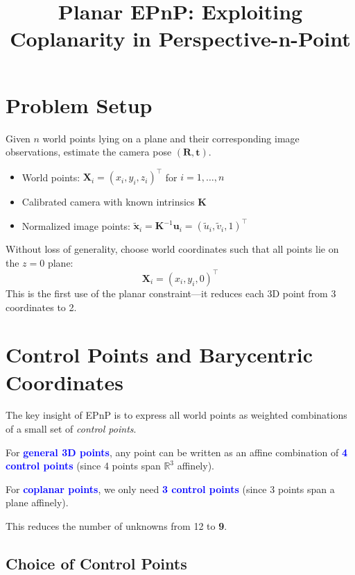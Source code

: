 \documentclass[11pt]{article}
\title{Planar EPnP: Exploiting Coplanarity in Perspective-n-Point}
\author{}
\date{}
\newcommand{\vect}[1]{\mathbf{#1}}
\newcommand{\mat}[1]{\mathbf{#1}}
\newcommand{\highlight}[1]{\textcolor{blue}{\textbf{#1}}}
\begin{document}
\maketitle

\section{Problem Setup}

Given $n$ world points lying on a plane and their corresponding image observations, estimate the camera pose $(\mat{R}, \vect{t})$.

\begin{itemize}
    \item World points: $\vect{X}_i = (x_i, y_i, z_i)^\top$ for $i = 1, \ldots, n$
    \item Calibrated camera with known intrinsics $\mat{K}$
    \item Normalized image points: $\tilde{\vect{x}}_i = \mat{K}^{-1}\vect{u}_i = (\tilde{u}_i, \tilde{v}_i, 1)^\top$
\end{itemize}

\begin{planarbox}
Without loss of generality, choose world coordinates such that all points lie on the $z=0$ plane:
\[
\vect{X}_i = (x_i, y_i, 0)^\top
\]
This is the first use of the planar constraint---it reduces each 3D point from 3 coordinates to 2.
\end{planarbox}

\section{Control Points and Barycentric Coordinates}

The key insight of EPnP is to express all world points as weighted combinations of a small set of \emph{control points}.

\begin{planarbox}
For \highlight{general 3D points}, any point can be written as an affine combination of \highlight{4 control points} (since 4 points span $\mathbb{R}^3$ affinely).

For \highlight{coplanar points}, we only need \highlight{3 control points} (since 3 points span a plane affinely).

This reduces the number of unknowns from 12 to \textbf{9}.
\end{planarbox}

\subsection{Choice of Control Points}
\end{document}

